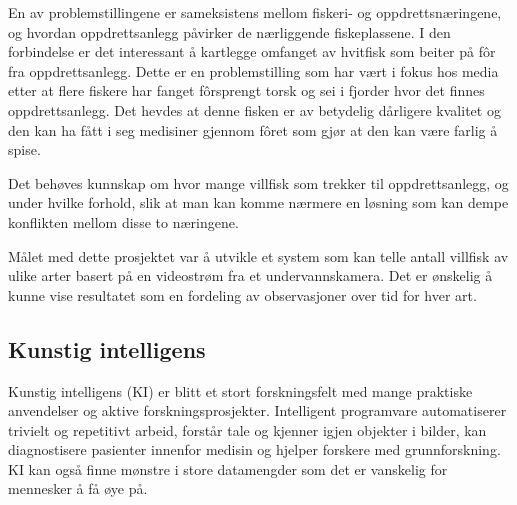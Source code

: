 En av problemstillingene er sameksistens mellom fiskeri- og oppdrettsnæringene, og hvordan oppdrettsanlegg påvirker de nærliggende fiskeplassene. I den forbindelse er det interessant å kartlegge omfanget av hvitfisk som beiter på fôr fra oppdrettsanlegg. Dette er en problemstilling som har vært i fokus hos media etter at flere fiskere har fanget fôrsprengt torsk og sei i fjorder hvor det finnes oppdrettsanlegg. Det hevdes at denne fisken er av betydelig dårligere kvalitet og den kan ha fått i seg medisiner gjennom fôret som gjør at den kan være farlig å spise. \cite{Olsen 2019}

Det behøves kunnskap om hvor mange villfisk som trekker til oppdrettsanlegg, og under hvilke forhold, slik at man kan komme nærmere en løsning som kan dempe konflikten mellom disse to næringene. 

Målet med dette prosjektet var å utvikle et system som kan telle antall villfisk av ulike arter basert på en videostrøm fra et undervannskamera. Det er ønskelig å kunne vise resultatet som en fordeling av observasjoner over tid for hver art.

\subsection{Kunstig intelligens}
\label{part:ai}

Kunstig intelligens (KI) er blitt et stort forskningsfelt med mange praktiske anvendelser og aktive forskningsprosjekter. Intelligent programvare automatiserer trivielt og repetitivt arbeid, forstår tale og kjenner igjen objekter i bilder, kan diagnostisere pasienter innenfor medisin og hjelper forskere med grunnforskning. KI kan også finne mønstre i store datamengder som det er vanskelig for mennesker å få øye på. \cite{Goodfellow m.fl. 2016 s. 1}

